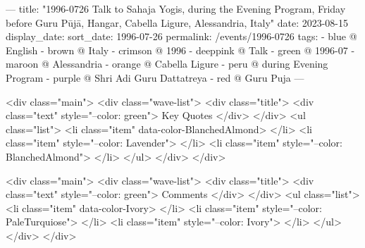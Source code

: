 ---
title: "1996-0726 Talk to Sahaja Yogis, during the Evening Program, Friday before Guru Pūjā, Hangar, Cabella Ligure, Alessandria, Italy"
date: 2023-08-15
display_date: 
sort_date: 1996-07-26
permalink: /events/1996-0726
tags:
  - blue @ English
  - brown @ Italy
  - crimson @ 1996
  - deeppink @ Talk
  - green @ 1996-07
  - maroon @ Alessandria
  - orange @ Cabella Ligure
  - peru @ during Evening Program
  - purple @ Shri Adi Guru Dattatreya
  - red @ Guru Puja
---

<div class="main">
  <div class="wave-list">
    <div class="title">
      <div class="text" style="--color: green">
        Key Quotes
      </div>
    </div>
    <ul class="list">
        <li class="item" data-color-BlanchedAlmond>
        </li>
        <li class="item" style="--color: Lavender">
        </li>
        <li class="item" style="--color: BlanchedAlmond">
        </li>
      </ul>
  </div>
</div>

<div class="main">
  <div class="wave-list">
    <div class="title">
      <div class="text" style="--color: green">
        Comments
      </div>
    </div>
    <ul class="list">
        <li class="item" data-color-Ivory>
        </li>
        <li class="item" style="--color: PaleTurquiose">
        </li>
        <li class="item" style="--color: Ivory">
        </li>
      </ul>
  </div>
</div>